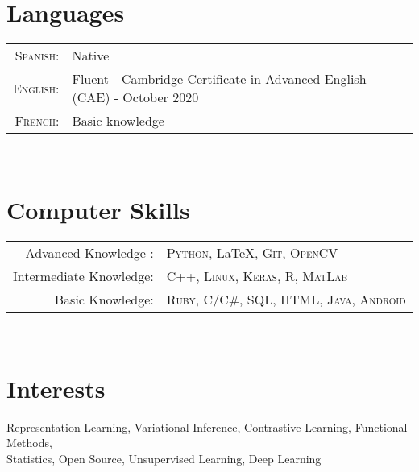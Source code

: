 \documentclass[a4paper,11pt]{article} %
\begin{document}
\section{Languages}

\begin{tabular}{rl}
\textsc{Spanish:} & Native\\
\textsc{English:} & Fluent - Cambridge Certificate in Advanced English (CAE) - October 2020\\
\textsc{French:} & Basic knowledge\\


\end{tabular}\\


\section{Computer Skills}

\begin{tabular}{rl}
Advanced Knowledge : & \textsc{Python}, { \LaTeX}\setmainfont[SmallCapsFont=Fontin SmallCaps]{Fontin-Regular}, \textsc{Git}, \textsc{OpenCV}\\

Intermediate Knowledge: &  \textsc{C++},  \textsc{Linux}, \textsc{Keras}, \textsc{R}, \textsc{MatLab} \\

Basic Knowledge: & \textsc{Ruby}, \textsc{C/C\#},  \textsc{SQL}, \textsc{HTML}, \textsc{Java}, \textsc{Android}\\


\end{tabular}\\


\section{Interests}

Representation Learning, Variational Inference, Contrastive Learning, Functional Methods, \\
Statistics, Open Source, Unsupervised Learning, Deep Learning
\end{document}
